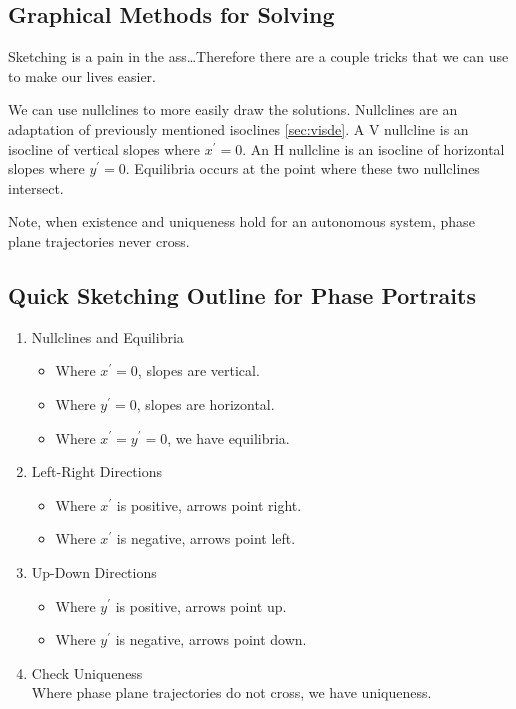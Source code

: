 \documentclass[12pt,landscape,twocolumn]{article}
\begin{document}
    \subsection{Graphical Methods for Solving}
    Sketching is a pain in the ass\dots Therefore there are a couple tricks that we can use to make our lives easier.

    We can use nullclines to more easily draw the solutions. Nullclines are an adaptation of previously mentioned isoclines \eqref{sec:visde}. A V nullcline is an isocline of vertical slopes where $x^\prime = 0$. An H nullcline is an isocline of horizontal slopes where $y^\prime = 0$. Equilibria occurs at the point where these two nullclines intersect.

    Note, when existence and uniqueness hold for an autonomous system, phase plane trajectories never cross.

    \subsection{Quick Sketching Outline for Phase Portraits}
    \begin{enumerate}
    \item Nullclines and Equilibria
        \begin{itemize}
        \item Where $x^\prime = 0$, slopes are vertical.
        \item Where $y^\prime = 0$, slopes are horizontal.
        \item Where $x^\prime = y^\prime = 0$, we have equilibria.
        \end{itemize}
    \item Left-Right Directions
        \begin{itemize}
        \item Where $x^\prime$ is positive, arrows point right.
        \item Where $x^\prime$ is negative, arrows point left.
        \end{itemize}
    \item Up-Down Directions
        \begin{itemize}
        \item Where $y^\prime$ is positive, arrows point up.
        \item Where $y^\prime$ is negative, arrows point down.
        \end{itemize}
    \item Check Uniqueness\\
    Where phase plane trajectories do not cross, we have uniqueness.
    \end{enumerate}
\end{document}
